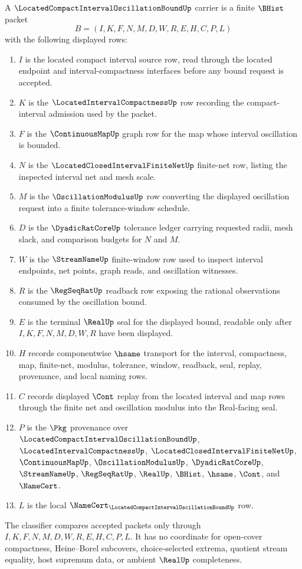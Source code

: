 \begin{definition}
\label{def:located-compact-interval-oscillation-bound-carrier}
A $\LocatedCompactIntervalOscillationBoundUp$ carrier is a finite $\BHist$ packet
$$
B=(I,K,F,N,M,D,W,R,E,H,C,P,L)
$$
with the following displayed rows:
\begin{enumerate}
\item $I$ is the located compact interval source row, read through the located endpoint and interval-compactness interfaces before any bound request is accepted.
\item $K$ is the $\LocatedIntervalCompactnessUp$ row recording the compact-interval admission used by the packet.
\item $F$ is the $\ContinuousMapUp$ graph row for the map whose interval oscillation is bounded.
\item $N$ is the $\LocatedClosedIntervalFiniteNetUp$ finite-net row, listing the inspected interval net and mesh scale.
\item $M$ is the $\OscillationModulusUp$ row converting the displayed oscillation request into a finite tolerance-window schedule.
\item $D$ is the $\DyadicRatCoreUp$ tolerance ledger carrying requested radii, mesh slack, and comparison budgets for $N$ and $M$.
\item $W$ is the $\StreamNameUp$ finite-window row used to inspect interval endpoints, net points, graph reads, and oscillation witnesses.
\item $R$ is the $\RegSeqRatUp$ readback row exposing the rational observations consumed by the oscillation bound.
\item $E$ is the terminal $\RealUp$ seal for the displayed bound, readable only after $I,K,F,N,M,D,W,R$ have been displayed.
\item $H$ records componentwise $\hsame$ transport for the interval, compactness, map, finite-net, modulus, tolerance, window, readback, seal, replay, provenance, and local naming rows.
\item $C$ records displayed $\Cont$ replay from the located interval and map rows through the finite net and oscillation modulus into the Real-facing seal.
\item $P$ is the $\Pkg$ provenance over $\LocatedCompactIntervalOscillationBoundUp$, $\LocatedIntervalCompactnessUp$, $\LocatedClosedIntervalFiniteNetUp$, $\ContinuousMapUp$, $\OscillationModulusUp$, $\DyadicRatCoreUp$, $\StreamNameUp$, $\RegSeqRatUp$, $\RealUp$, $\BHist$, $\hsame$, $\Cont$, and $\NameCert$.
\item $L$ is the local $\NameCert_{\LocatedCompactIntervalOscillationBoundUp}$ row.
\end{enumerate}
The classifier compares accepted packets only through $I,K,F,N,M,D,W,R,E,H,C,P,L$. It has no coordinate for open-cover compactness, Heine--Borel subcovers, choice-selected extrema, quotient stream equality, host supremum data, or ambient $\RealUp$ completeness.
\end{definition}

